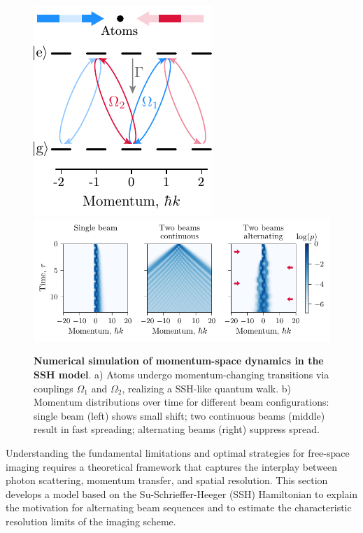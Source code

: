 


\begin{figure}
    \centering
    \includegraphics{fig-ai/ssh-scheme.pdf}
    \hfill
    \includegraphics{fig-py/ssh-model.pdf}
    \caption[Numerical simulation of momentum-space dynamics in the SSH model]{
        \textbf{Numerical simulation of momentum-space dynamics in the SSH model}. 
        a) Atoms undergo momentum-changing transitions via couplings $\Omega_1$ and $\Omega_2$, realizing a SSH-like quantum walk.
        b) Momentum distributions over time for different beam configurations: single beam (left) shows small shift; two continuous beams (middle) result in fast spreading; alternating beams (right) suppress spread.
    }
    \label{fig:sshmodel}
\end{figure}


Understanding the fundamental limitations and optimal strategies for free-space imaging requires a theoretical framework that captures the interplay between photon scattering, momentum transfer, and spatial resolution. This section develops a model based on the Su-Schrieffer-Heeger (SSH) Hamiltonian to explain the motivation for alternating beam sequences and to estimate the characteristic resolution limits of the imaging scheme.



